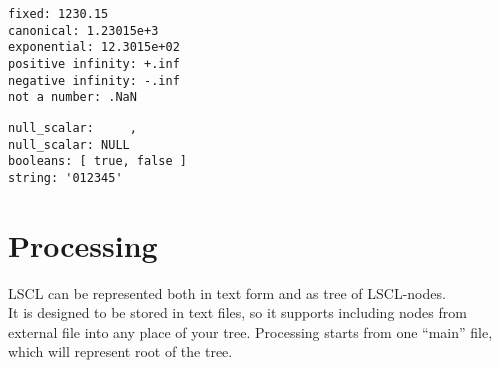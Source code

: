 \begin{lstlisting}[caption = floating point]
fixed: 1230.15
canonical: 1.23015e+3
exponential: 12.3015e+02
positive infinity: +.inf
negative infinity: -.inf
not a number: .NaN
\end{lstlisting}

\begin{lstlisting}[caption = miscellaneous]
null_scalar:     ,
null_scalar: NULL
booleans: [ true, false ]
string: '012345'
\end{lstlisting}





\section{Processing}
LSCL can be represented both in text form and as tree of LSCL-nodes.  \\
It is designed to be stored in text files, so it supports including nodes from external file into any place of your tree. Processing starts from one ``main'' file, which will represent root of the tree. 

